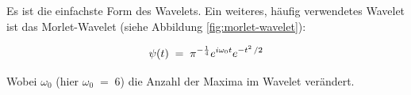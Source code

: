 Es ist die einfachste Form des Wavelets. Ein weiteres, häufig verwendetes Wavelet ist das Morlet-Wavelet (siehe Abbildung \ref{fig:morlet-wavelet}):

\begin{equation} \label{eq:morlet}
    \psi (t) \; = \; \pi^{-{1 \over 4}} e^{i\omega_0 t}e^{-{t^2 \, / 2}}
\end{equation}

Wobei \(\omega_0\) (hier \(\omega_0 \; = \; 6\)) die Anzahl der Maxima im Wavelet verändert. \cite{Torrence1998}

\endinput
